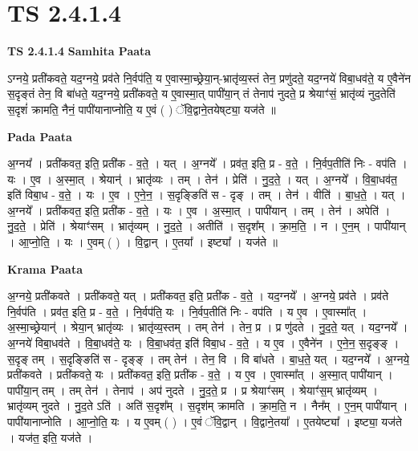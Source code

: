 \documentclass[17pt]{extarticle}
\begin{document}
\section*{ TS 2.4.1.4 }

\textbf{TS 2.4.1.4 } \newline
\textbf{Samhita Paata} \newline

ऽग्नये॒ प्रती॑कवते॒ यद॒ग्नये॒ प्रव॑ते नि॒र्वप॑ति॒ य ए॒वास्मा॒च्छ्रेया॒न्-भ्रातृ॑व्य॒स्तं तेन॒ प्रणु॑दते॒ यद॒ग्नये॑ विबा॒धव॑ते॒ य ए॒वैने॑न स॒दृङ्तं तेन॒ वि बा॑धते॒ यद॒ग्नये॒ प्रती॑कवते॒ य ए॒वास्मा॒त् पापी॑या॒न् तं तेनाप॑ नुदते॒ प्र श्रेयाꣳ॑सं॒ भ्रातृ॑व्यं नुद॒तेति॑ स॒दृशं॑ क्रामति॒ नैनं॒ पापी॑यानाप्नोति॒ य ए॒वं ( ) ॅवि॒द्वाने॒तयेष्‌ट्या॒ यज॑ते ॥ \newline

\textbf{Pada Paata} \newline

अ॒ग्नय᳚ । प्रती॑कवत॒ इति॒ प्रती॑क - व॒ते॒ । यत् । अ॒ग्नये᳚ । प्रव॑त॒ इति॒ प्र - व॒ते॒ । नि॒र्वप॒तीति॑ निः - वप॑ति । यः । ए॒व । अ॒स्मा॒त् । श्रेयान्॑ । भ्रातृ॑व्यः । तम् । तेन॑ । प्रेति॑ । नु॒द॒ते॒ । यत् । अ॒ग्नये᳚ । वि॒बा॒धव॑त॒ इति॑ विबा॒ध - व॒ते॒ । यः । ए॒व । ए॒ने॒न॒ । स॒दृङ्ङिति॑ स - दृङ् । तम् । तेन॑ । वीति॑ । बा॒ध॒ते॒ । यत् । अ॒ग्नये᳚ । प्रती॑कवत॒ इति॒ प्रती॑क - व॒ते॒ । यः । ए॒व । अ॒स्मा॒त् । पापी॑यान् । तम् । तेन॑ । अपेति॑ । नु॒द॒ते॒ । प्रेति॑ । श्रेयाꣳ॑सम् । भ्रातृ॑व्यम् । नु॒द॒ते॒ । अतीति॑ । स॒दृश᳚म् । क्रा॒म॒ति॒ । न । ए॒न॒म् । पापी॑यान् । आ॒प्नो॒ति॒ । यः । ए॒वम् ( ) । वि॒द्वान् । ए॒तया᳚ । इष्ट्या᳚ । यज॑ते ॥  \newline


\textbf{Krama Paata} \newline

अ॒ग्नये॒ प्रती॑कवते । प्रती॑कवते॒ यत् । प्रती॑कवत॒ इति॒ प्रती॑क - व॒ते॒ । यद॒ग्नये᳚ । अ॒ग्नये॒ प्रव॑ते । प्रव॑ते नि॒र्वप॑ति । प्रव॑त॒ इति॒ प्र - व॒ते॒ । नि॒र्वप॑ति॒ यः । नि॒र्वप॒तीति॑ निः - वप॑ति । य ए॒व । ए॒वास्मा᳚त् । अ॒स्मा॒च्छ्रेयान्॑ । श्रेया॒न् भ्रातृ॑व्यः । भ्रातृ॑व्य॒स्तम् । तम् तेन॑ । तेन॒ प्र । प्र णु॑दते । नु॒द॒ते॒ यत् । यद॒ग्नये᳚ । अ॒ग्नये॑ विबा॒धव॑ते । वि॒बा॒धव॑ते॒ यः । वि॒बा॒धव॑त॒ इति॑ विबा॒ध - 
व॒ते॒ । य ए॒व । ए॒वैने॑न । ए॒ने॒न॒ स॒दृङ्ङ् । स॒दृङ् तम् । स॒दृङ्ङिति॑ स - दृङ्ङ् । तम् तेन॑ । तेन॒ वि । वि बा॑धते । बा॒ध॒ते॒ यत् । यद॒ग्नये᳚ । अ॒ग्नये॒ प्रती॑कवते । प्रती॑कवते॒ यः । प्रती॑कवत॒ इति॒ प्रती॑क - व॒ते॒ । य ए॒व । ए॒वास्मा᳚त् । अ॒स्मा॒त् पापी॑यान् । पापी॑या॒न् तम् । तम् तेन॑ । तेनाप॑ । अप॑ नुदते । नु॒द॒ते॒ प्र । प्र श्रेयाꣳ॑सम् । श्रेयाꣳ॑स॒म् भ्रातृ॑व्यम् । भ्रातृ॑व्यम् नुदते । नु॒द॒ते ऽति॑ । अति॑ स॒दृश᳚म् । स॒दृश॑म् क्रामति । क्रा॒म॒ति॒ न । नैन᳚म् । ए॒न॒म् पापी॑यान् । पापी॑यानाप्नोति । आ॒प्नो॒ति॒ यः । य ए॒वम् ( ) । ए॒वं ॅवि॒द्वान् । वि॒द्वाने॒तया᳚ । ए॒तयेष्ट्या᳚ । इष्ट्या॒ यज॑ते । यज॑त॒ इति॒ यज॑ते । \newline
\end{document}
